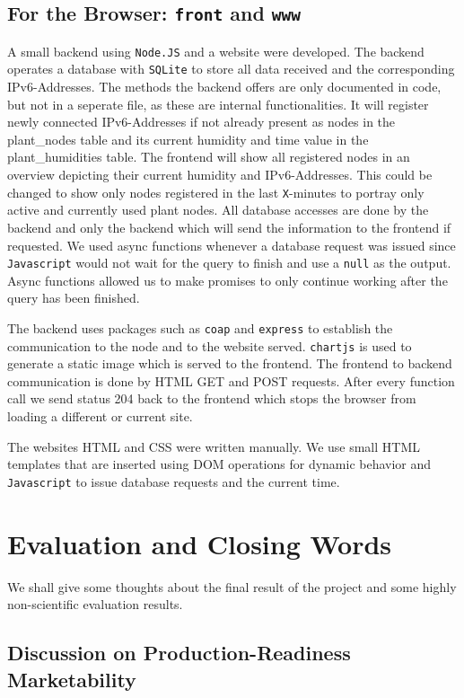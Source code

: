 \documentclass[acmtog, language=english, nonacm]{acmart}
\begin{document}
    \subsection{For the Browser: \texttt{front} and \texttt{www}}

    A small backend using \texttt{Node.JS} and a website were developed. The backend operates a database with \texttt{SQLite} to store all data received and the corresponding IPv6-Addresses. The methods the backend offers are only documented in code, but not in a seperate file, as these are internal functionalities. It will register newly connected IPv6-Addresses if not already present as nodes in the plant\_nodes table and its current humidity and time value in the plant\_humidities table. The frontend will show all registered nodes in an overview depicting their current humidity and IPv6-Addresses. This could be changed to show only nodes registered in the last \texttt{X}-minutes to portray only active and currently used plant nodes. All database accesses are done by the backend and only the backend which will send the information to the frontend if requested. We used async functions whenever a database request was issued since \texttt{Javascript} would not wait for the query to finish and use a \texttt{null} as the output. Async functions allowed us to make promises to only continue working after the query has been finished. 

    The backend uses packages such as \texttt{coap} and \texttt{express} to establish the communication to the node and to the website served. \texttt{chartjs} is used to generate a static image which is served to the frontend. The frontend to backend communication is done by HTML GET and POST requests. After every function call we send status 204 back to the frontend which stops the browser from loading a different or current site.
    
    The websites HTML and CSS were written manually. We use small HTML templates that are inserted using DOM operations for dynamic behavior and \texttt{Javascript} to issue database requests and the current time.

    \section{Evaluation and Closing Words}

    We shall give some thoughts about the final result of the project and some highly non-scientific evaluation results.

    \subsection{Discussion on Production-Readiness Marketability}
\end{document}
